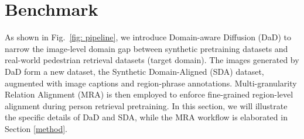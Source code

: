 



\section{Benchmark} 
\label{benchmark}
\noindent As shown in Fig.~\ref{fig: pipeline}, we introduce Domain-aware Diffusion (DaD) to narrow the image-level domain gap between synthetic pretraining datasets and real-world pedestrian retrieval datasets (target domain). 
The images generated by DaD form a new dataset, the Synthetic Domain-Aligned (SDA) dataset, augmented with image captions and region-phrase annotations. 
Multi-granularity Relation Alignment (MRA) is then employed to enforce fine-grained region-level alignment during person retrieval pretraining.
In this section, we will illustrate the specific details of DaD and SDA, while the MRA workflow is elaborated in Section \ref{method}.

